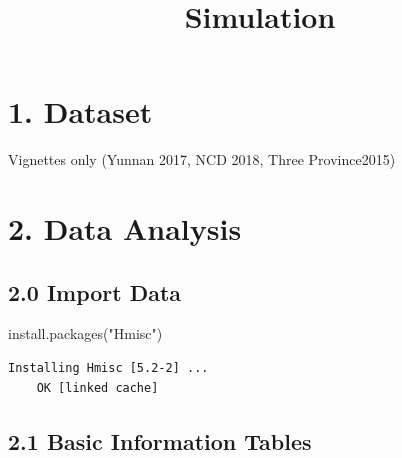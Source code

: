 \documentclass[
  letterpaper,
  DIV=11,
  numbers=noendperiod]{scrartcl}
\title{Simulation}
\author{}
\date{}
\newenvironment{Shaded}{\begin{snugshade}}{\end{snugshade}}
\newcommand{\AttributeTok}[1]{\textcolor[rgb]{0.40,0.45,0.13}{#1}}
\newcommand{\ConstantTok}[1]{\textcolor[rgb]{0.56,0.35,0.01}{#1}}
\newcommand{\FunctionTok}[1]{\textcolor[rgb]{0.28,0.35,0.67}{#1}}
\newcommand{\NormalTok}[1]{\textcolor[rgb]{0.00,0.23,0.31}{#1}}
\newcommand{\OtherTok}[1]{\textcolor[rgb]{0.00,0.23,0.31}{#1}}
\newcommand{\SpecialCharTok}[1]{\textcolor[rgb]{0.37,0.37,0.37}{#1}}
\newcommand{\StringTok}[1]{\textcolor[rgb]{0.13,0.47,0.30}{#1}}
\begin{document}
\maketitle


\section{1. Dataset}\label{dataset}

Vignettes only (Yunnan 2017, NCD 2018, Three Province2015)

\section{2. Data Analysis}\label{data-analysis}

\subsection{2.0 Import Data}\label{import-data}

\begin{Shaded}
\begin{Highlighting}[]
\FunctionTok{install.packages}\NormalTok{(}\StringTok{"Hmisc"}\NormalTok{)}
\end{Highlighting}
\end{Shaded}

\begin{verbatim}
Installing Hmisc [5.2-2] ...
    OK [linked cache]
\end{verbatim}

\begin{Shaded}
\end{Shaded}

\subsection{2.1 Basic Information
Tables}\label{basic-information-tables}
\end{document}
